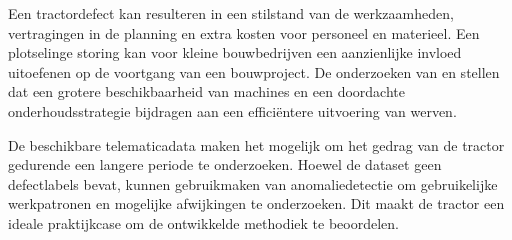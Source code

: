 
Een tractordefect kan resulteren in een stilstand van de werkzaamheden, vertragingen in de planning en extra kosten voor personeel en materieel. Een plotselinge storing kan voor kleine bouwbedrijven een aanzienlijke invloed uitoefenen op de voortgang van een bouwproject. De onderzoeken van \textcite{Farwaha2024} en \textcite{Mikulic2024} stellen dat een grotere beschikbaarheid van machines en een doordachte onderhoudsstrategie bijdragen aan een efficiëntere uitvoering van werven.



De beschikbare telematicadata maken het mogelijk om het gedrag van de tractor gedurende een langere periode te onderzoeken. Hoewel de dataset geen defectlabels bevat, kunnen gebruikmaken van anomaliedetectie om gebruikelijke werkpatronen en mogelijke afwijkingen te onderzoeken. Dit maakt de tractor een ideale praktijkcase om de ontwikkelde methodiek te beoordelen.


